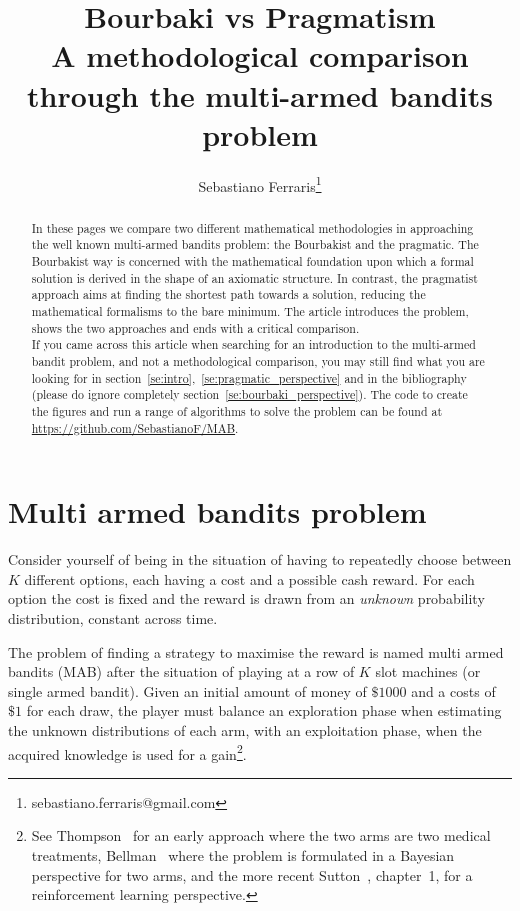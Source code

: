 \documentclass[]{scrartcl}
\title{Bourbaki vs Pragmatism \\ A methodological comparison through the multi-armed bandits problem}
\author{Sebastiano Ferraris\footnote{sebastiano.ferraris@gmail.com}}
\begin{document}
\maketitle

\begin{abstract}
In these pages we compare two different mathematical methodologies in approaching the well known multi-armed bandits problem: the Bourbakist and the pragmatic. The Bourbakist way is concerned with the mathematical foundation upon which a formal solution is derived in the shape of an axiomatic structure. In contrast, the pragmatist approach aims at finding the shortest path towards a solution, reducing the mathematical formalisms to the bare minimum.
The article introduces the problem, shows the two approaches and ends with a critical comparison. \\

\noindent
If you came across this article when searching for an introduction to the multi-armed bandit problem, and not a methodological comparison, you may still find what you are looking for in section~\ref{se:intro},~\ref{se:pragmatic_perspective} and in the bibliography (please do ignore completely section~\ref{se:bourbaki_perspective}). The code to create the figures and run a range of algorithms to solve the problem can be found at \href{https://github.com/SebastianoF/multi-armed-bandits-testbed}{https://github.com/SebastianoF/MAB}. 
\end{abstract}


\section{Multi armed bandits problem}
\label{se:intro}
Consider yourself of being in the situation of having to repeatedly choose between $K$ different options, each having a cost and a possible cash reward. For each option the cost is fixed and the reward is drawn from an \emph{unknown} probability distribution, constant across time.

The problem of finding a strategy to maximise the reward is named multi armed bandits (MAB) after the situation of playing at a row of $K$ slot machines (or single armed bandit). Given an initial amount of money of $\$1000$ and a costs of $\$1$ for each draw, the player must balance an exploration phase when estimating the unknown distributions of each arm, with an exploitation phase, when the acquired knowledge is used for a gain\footnote{See Thompson~\cite{thompson1933likelihood} for an early approach where the two arms are two medical treatments, Bellman~\cite{bellman1956problem} where the problem is formulated in a Bayesian perspective for two arms, and the more recent Sutton~\cite{sutton2018reinforcement}, chapter~1, for a reinforcement learning perspective.}.
\end{document}
